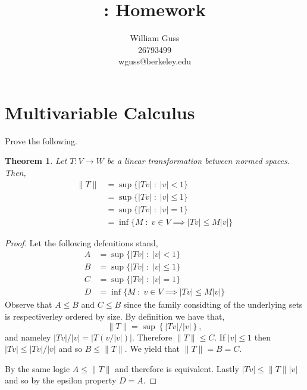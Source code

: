 \documentclass[letter]{article}
\title{\bCLASS: Homework \bHWN}
\author{William Guss\\26793499\\wguss@berkeley.edu}
\newtheorem{theorem}{Theorem}
\newenvironment{menumerate}{%
  \edef\backupindent{\the\parindent}%
  \enumerate%
  \setlength{\parindent}{\backupindent}%
}{\endenumerate}
\begin{document}
\maketitle
\thispagestyle{empty}


\setcounter{section}{4}
\section{Multivariable Calculus}
\begin{menumerate}
	\setcounter{enumi}{2}
	\item %
	Prove the following.
	\begin{theorem}
		Let $T: V\to W$ be a linear transformation between normed spaces. Then, 
		\begin{equation}
			\begin{aligned}
				\|T\| &= \sup \{|Tv|\;:\;|v| < 1 \} \\
				 &= \sup \{|Tv|\;:\;|v| \leq 1 \} \\
				 &= \sup \{|Tv|\;:\;|v| = 1 \} \\
				 &= \inf \{M\;:\;v \in V \implies |Tv| \leq M|v| \}
			\end{aligned}
		\end{equation}
	\end{theorem}
	\begin{proof}
		Let the following defenitions stand,
		\begin{equation}
			\begin{aligned}
				A &= \sup \{|Tv|\;:\;|v| < 1 \} \\
				B &= \sup \{|Tv|\;:\;|v| \leq 1 \} \\
				C &= \sup \{|Tv|\;:\;|v| = 1 \} \\
				D &= \inf \{M\;:\;v \in V \implies |Tv| \leq M|v| \}
			\end{aligned}
		\end{equation}
		Observe that $A \leq B$ and $C \leq B$ since the family considting of the underlying sets
		is respectiverley ordered by size.
		By definition we have that, 
		$$\|T\| = \sup\left\{|Tv|/|v|\right\},$$ and nameley $|Tv|/|v| = |T(v/|v|)|$. Therefore
		$\|T\| \leq C.$
		If $|v| \leq 1$ then $|Tv| \leq |Tv|/|v|$ and so $B \leq \|T\|.$
		We yield that $\|T\| = B= C.$ 

		By the same logic $A \leq \|T\|$ and therefore is equivalent. 
		Lastly $|Tv| \leq \|T\||v|$ and so by the epsilon property $D= A$.
	\end{proof}


\end{menumerate}
\end{document}
